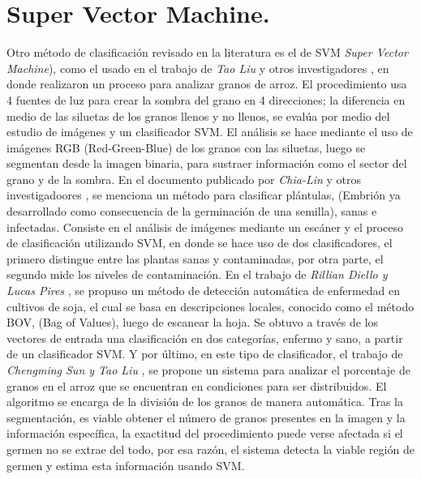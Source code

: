 \section{Super Vector Machine.}
	Otro método de clasificación revisado en la literatura es el de SVM \textit{Super Vector Machine}), como el usado en el trabajo de \textit{Tao Liu} y otros investigadores \cite{LIU201679}, en donde realizaron un proceso para analizar granos de arroz. El procedimiento usa 4 fuentes de luz para crear la sombra del grano en 4 direcciones; la diferencia en medio de las siluetas de los granos llenos y no llenos, se evalúa por medio del estudio de imágenes y un clasificador SVM. El análisis se hace mediante el uso de imágenes RGB (Red-Green-Blue) de los granos con las siluetas, luego se segmentan desde la imagen binaria, para sustraer información como el sector del grano y de la sombra. En el documento publicado por \textit{Chia-Lin}  y otros investigadoores \cite{CHUNG2016404}, se menciona un método para clasificar plántulas, (Embrión ya desarrollado como consecuencia de la germinación de una semilla), sanas e infectadas. Consiste en el análisis de imágenes mediante un escáner y el proceso de clasificación utilizando SVM, en donde se hace uso de dos clasificadores, el primero distingue entre las plantas sanas y contaminadas, por otra parte, el segundo mide los niveles de contaminación. En el trabajo de \textit{Rillian Diello y Lucas Pires} \cite{PIRES201648}, se propuso un método de detección automática de enfermedad en cultivos de soja, el cual se basa en descripciones locales, conocido como el método BOV, (Bag of Values), luego de escanear la hoja. Se obtuvo a través de los vectores de entrada una clasificación en dos categorías, enfermo y sano, a partir de un clasificador SVM. Y por último, en este tipo de clasificador, el trabajo de \textit{Chengming Sun y Tao Liu} \cite{SUN2014426}, se propone un sistema para analizar el porcentaje de granos en el arroz que se encuentran en condiciones para ser distribuidos. El algoritmo se encarga de la división de los granos de manera automática. Tras la segmentación, es viable obtener el número de granos presentes en la imagen y la información específica, la exactitud del procedimiento puede verse afectada si el germen no se extrae del todo, por esa razón, el sistema detecta la viable región de germen y estima esta información usando SVM.\\

